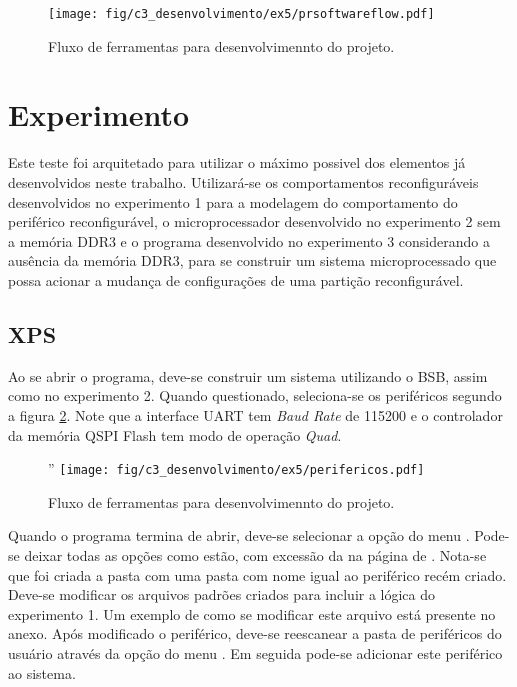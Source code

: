 \documentclass[11pt,a4paper,oneside]{book}
\begin{document}
\begin{figure}[htp]
\centering
\texttt{[image: fig/c3\_desenvolvimento/ex5/prsoftwareflow.pdf]}
\caption{Fluxo de ferramentas para desenvolvimennto do projeto.}
\label{fig:ex5:prsoftwareflow}
\end{figure}

\section{Experimento}
Este teste foi arquitetado para utilizar o máximo possivel dos elementos já desenvolvidos  neste trabalho.
Utilizará-se os comportamentos reconfiguráveis desenvolvidos no experimento 1 para a modelagem do comportamento do periférico reconfigurável, o microprocessador desenvolvido no experimento 2 sem a memória DDR3 e o programa desenvolvido no experimento 3 considerando a ausência da memória DDR3, para se construir um sistema microprocessado que possa acionar a mudança de configurações de uma partição reconfigurável.

\subsection{XPS}
Ao se abrir o programa, deve-se construir um sistema utilizando o BSB, assim como no experimento 2.
Quando questionado, seleciona-se os periféricos segundo a figura \ref{fig:ex5:perifericos}.
Note que a interface UART tem \textit{Baud Rate} de 115200 e o controlador da memória QSPI Flash tem modo de operação \textit{Quad}.

\begin{figure}[htp]
\centering''
\texttt{[image: fig/c3\_desenvolvimento/ex5/perifericos.pdf]}
\caption{Fluxo de ferramentas para desenvolvimennto do projeto.}
\label{fig:ex5:perifericos}
\end{figure}

Quando o programa termina de abrir, deve-se selecionar a opção  do menu .
Pode-se deixar todas as opções como estão, com excessão da  na página de .
Nota-se que foi criada a pasta  com uma pasta com nome igual ao periférico recém criado.
Deve-se modificar os arquivos padrões criados para incluir a lógica do experimento 1.
Um exemplo de como se modificar este arquivo está presente no anexo.
Após modificado o periférico, deve-se reescanear a pasta de periféricos do usuário através da opção  do menu .
Em seguida pode-se adicionar este periférico ao sistema.
\end{document}
